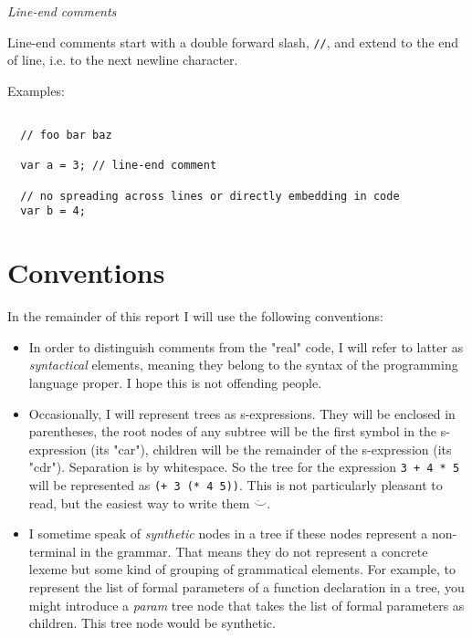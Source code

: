 \documentclass[11pt,a4paper]{article}
\begin{document}
\textit{Line-end comments}

Line-end comments start with a double forward slash, \texttt{//}, and extend to
the end of line, i.e. to the next newline character.

Examples:

\begin{verbatim}

  // foo bar baz
  
  var a = 3; // line-end comment

  // no spreading across lines or directly embedding in code
  var b = 4;

\end{verbatim}

\section{Conventions}

In the remainder of this report I will use the following conventions:

\begin{itemize}
\item In order to distinguish comments from the "real" code, I
will refer to latter as \emph{syntactical} elements, meaning they belong to the
syntax of the programming language proper. I hope this is not offending people.

\item Occasionally, I will represent trees as s-expressions. They will be
enclosed in parentheses, the root nodes of any subtree will be the first symbol
in the s-expression (its "car"), children will be the remainder of the
s-expression (its "cdr"). Separation is by whitespace. So the tree for the
expression \texttt{3 + 4 * 5} will be represented as \texttt{(+ 3 (* 4 5))}.
This is not particularly pleasant to read, but the easiest way to write them
$\ddot\smile$.

\item I sometime speak of \emph{synthetic} nodes in a tree if these nodes
  represent a non-terminal in the grammar. That means they do not represent a
  concrete lexeme but some kind of grouping of grammatical elements. For example,
  to represent the list of formal parameters of a function declaration in a
  tree, you might introduce a \emph{param} tree node that takes the list of
  formal parameters as children. This tree node would be synthetic.

\end{itemize}
\end{document}
